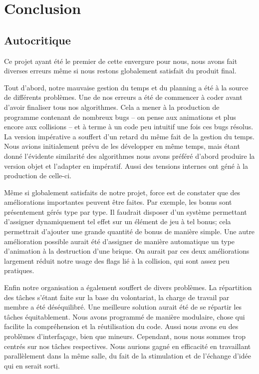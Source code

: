 \section{Conclusion}
  
  \subsection{Autocritique }
    Ce projet ayant été le premier de cette envergure pour nous, nous avons fait diverses erreurs même si nous restons globalement satisfait du produit final.

    Tout d'abord, notre mauvaise gestion du temps et du planning a été à la source de différents problèmes.
    Une de nos erreurs a été de commencer à coder avant d'avoir finaliser tous nos algorithmes. Cela a mener à la production de programme contenant de nombreux bugs -- on pense aux animations et plus encore aux collisions -- et à terme à un code peu intuitif une fois ces bugs résolus.
    La version impérative a souffert d'un retard du même fait de la gestion du temps. Nous avions initialement prévu de les développer en même temps, mais étant donné l'évidente similarité des algorithmes nous avons préféré d'abord produire la version objet et l'adapter en impératif. Aussi des tensions internes ont géné à la production de celle-ci.

    Même si globalement satisfaits de notre projet, force est de constater que des améliorations importantes peuvent être faites. Par exemple, les bonus sont présentement gérés type par type. Il faudrait disposer d'un système permettant d'assigner dynamiquement tel effet sur un élément de jeu à tel bonus; cela permettrait d'ajouter une grande quantité de bonus de manière simple. Une autre amélioration possible aurait été d'assigner de manière automatique un type d'animation à la destruction d'une brique. On aurait par ces deux améliorations largement réduit notre usage des flags lié à la collision, qui sont assez peu pratiques.

    Enfin notre organisation a également souffert de divers problèmes. La répartition des tâches s'étant faite sur la base du volontariat, la charge de travail par membre a été déséquilibré. Une meilleure solution aurait été de se répartir les tâches équitablement.
     Nous avons programmé de manière modulaire, chose qui facilite la compréhension et la réutilisation du code. Aussi nous avons eu des problèmes d'interfaçage, bien que mineurs. Cependant, nous nous sommes trop centrés sur nos tâches respectives. Nous aurions gagné en efficacité en travaillant parallèlement dans la même salle, du fait de la stimulation et de l'échange d'idée qui en serait sorti.
    
